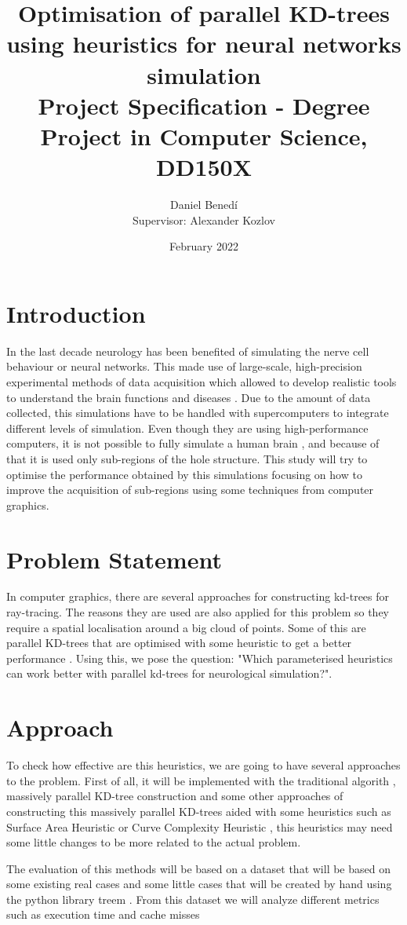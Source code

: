 \documentclass{article}
\title{Optimisation of parallel KD-trees using heuristics for neural networks simulation \\ Project Specification - Degree Project in Computer Science, DD150X}
\author{Daniel Benedí \\ Supervisor: Alexander Kozlov}
\date{February 2022}
\begin{document}
\maketitle

\section*{Introduction}
In the last decade neurology has been benefited of simulating the nerve cell
behaviour or neural networks. This made use of large-scale, high-precision 
experimental methods of data acquisition which allowed to develop realistic tools
to understand the brain functions and diseases \cite{MARKRAM201139}. Due to the
amount of data collected, this simulations have to be handled with supercomputers
to integrate different levels of simulation. Even though they are using high-performance
computers, it is not possible to fully simulate a human brain \cite{FURBER2006},
and because of that it is used only sub-regions of the hole structure. This study
will try to optimise the performance obtained by this simulations focusing on how
to improve the acquisition of sub-regions using some techniques from computer
graphics.

\section*{Problem Statement}
In computer graphics, there are several approaches for constructing kd-trees for
ray-tracing. The reasons they are used are also applied for this problem so they
require a spatial localisation around a big cloud of points. Some of this are
parallel KD-trees that are optimised with some heuristic to get a better performance
\cite{CHOI2010}. Using this, we pose the question: "Which parameterised heuristics
can work better with parallel kd-trees for neurological simulation?".

\section*{Approach}
To check how effective are this heuristics, we are going to have several approaches
to the problem. First of all, it will be implemented with the traditional
algorith \cite{Adamsson_Vorkapic_2016}, massively parallel KD-tree construction
\cite{7169256} and some other approaches of constructing this massively parallel
KD-trees aided with some heuristics such as Surface Area Heuristic \cite{CHOI2010}
or Curve Complexity Heuristic \cite{LU2021}, this heuristics may need some little
changes to be more related to the actual problem.

The evaluation of this methods will be based on a dataset that will be based
on some existing real cases \cite{NeuroMorpho} and some little cases that
will be created by hand using the python library treem \cite{treem}. From this
dataset we will analyze different metrics such as execution time and cache misses



\printbibliography
\end{document}
